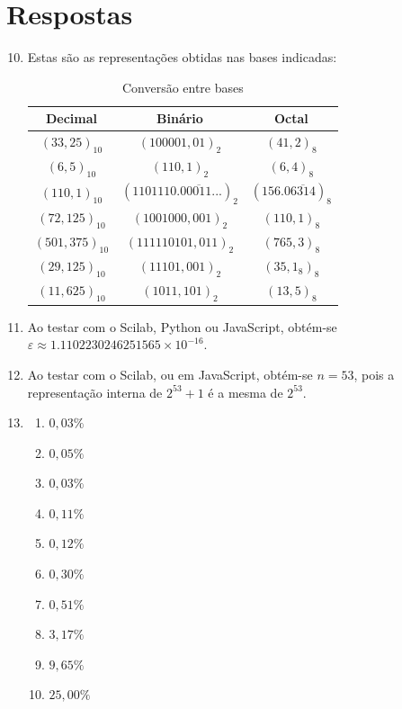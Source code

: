 \documentclass[12pt,a4paper]{article}
\begin{document}
\section*{Respostas}
\begin{enumerate}
\setcounter{enumi}{9}
\item Estas são as representações obtidas nas bases indicadas:
\begin{table}[h]
\centering
\caption{Conversão entre bases}
\begin{tabular}{|c|c|c|}
\hline
  \textbf{Decimal}
& \textbf{Binário}
& \textbf{Octal} \\ \hline
  $(33,25)_{10}$
& $(100001,01)_2$
& $(41,2)_8$ \\ \hline
  $(6,5)_{10}$
& $(110,1)_2$
& $(6,4)_8$ \\ \hline
  $(110,1)_{10}$
& $(1101110.0\overline{0011}...)_2$
& $(156.0\overline{6314})_8$ \\ \hline
  $(72,125)_{10}$
& $(1001000,001)_2$
& $(110,1)_8$ \\ \hline
  $(501,375)_{10}$
& $(111110101,011)_2$
& $(765,3)_8$ \\ \hline
  $(29,125)_{10}$
& $(11101,001)_2$
& $(35,1_8)_8$ \\ \hline
  $(11,625)_{10}$
& $(1011,101)_2$
& $(13,5)_8$ \\ \hline
\end{tabular}
\end{table}

\item Ao testar com o Scilab, Python ou JavaScript, obtém-se $\varepsilon \approx 1.1102230246251565 \times 10 ^{-16}$.

\item Ao testar com o Scilab, ou em JavaScript, obtém-se $n=53$, pois a representação interna de $2^{53} +1$ é a mesma de $2^{53}$.

\item
\begin{multicols}{5}
\begin{enumerate}
\item $0,03\%$
\item $0,05\%$
\item $0,03\%$
\item $0,11\%$
\item $0,12\%$
\item $0,30\%$
\item $0,51\%$
\item $3,17\%$
\item $9,65\%$
\item $25,00\%$
\end{enumerate}
\end{multicols}


\end{enumerate}
\end{document}
